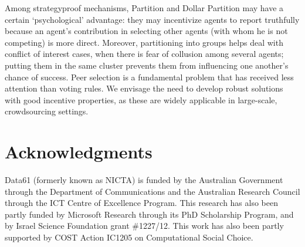 \documentclass[letterpaper]{article}
\begin{document}
Among strategyproof mechanisms, Partition and Dollar Partition may
have a certain `psychological' advantage: they may incentivize agents to report truthfully because an agent's contribution in selecting other agents (with whom he is not competing) is more direct.
Moreover, partitioning into groups helps deal with conflict of interest cases, when there is fear of collusion among several agents; putting them in the same cluster prevents them from influencing one another's chance of success.
Peer selection is a fundamental problem that has received less attention than voting rules.  We envisage the need to develop robust solutions with good incentive properties, as these are widely applicable in large-scale, crowdsourcing settings.

\section*{Acknowledgments}
Data61 (formerly known as NICTA) is funded by the Australian Government through the Department of Communications and the Australian Research Council through the ICT Centre of Excellence Program. This research has also been partly funded by Microsoft Research through its PhD Scholarship Program, and by Israel Science Foundation grant \#1227/12. This work has also been partly supported by COST Action IC1205 on Computational Social Choice.
\end{document}
